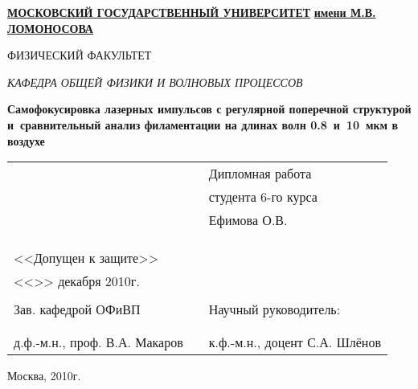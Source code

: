\begin{titlepage}
\begin{center}
        \textbf{\underline{МОСКОВСКИЙ ГОСУДАРСТВЕННЫЙ УНИВЕРСИТЕТ}}
        \textbf{\underline{имени М.В. ЛОМОНОСОВА}}

        \vspace{0.8cm}

        ФИЗИЧЕСКИЙ ФАКУЛЬТЕТ

        \vspace{0.4cm}

        \textit{КАФЕДРА ОБЩЕЙ ФИЗИКИ И ВОЛНОВЫХ ПРОЦЕССОВ}

        \vspace{3cm}

        \textbf{Самофокусировка лазерных импульсов с регулярной поперечной структурой и~сравнительный анализ филаментации на длинах волн 0.8~и~10~мкм в воздухе}

        \vfill
        \vfill

        \begin{tabular*}{\textwidth}{p{}p{}p{}}
                                                            & & Дипломная работа \tabularnewline
                                                            & & студента 6-го курса \tabularnewline
                                                            & & Ефимова О.В. \tabularnewline
                                                            & & \tabularnewline
                                                            & & \underline{\phantom{Четкая подпись}} \tabularnewline
                                                            & & \tabularnewline
            <<Допущен к защите>>                            & & \tabularnewline
            <<\underline{\phantom{ 23 }}>> декабря 2010г. & & \tabularnewline
                                                            & & \tabularnewline
            Зав. кафедрой ОФиВП                             & & Научный руководитель: \tabularnewline
                                                            & & \tabularnewline
            \underline{\phantom{Четкая подпись}}          & & \underline{\phantom{Четкая подпись}} \tabularnewline
            д.ф.-м.н., проф. В.А. Макаров                   & & к.ф.-м.н., доцент С.А. Шлёнов \tabularnewline
        \end{tabular*}

        \vfill

        Москва, 2010г.
\end{center}
\restoregeometry
\end{titlepage}

